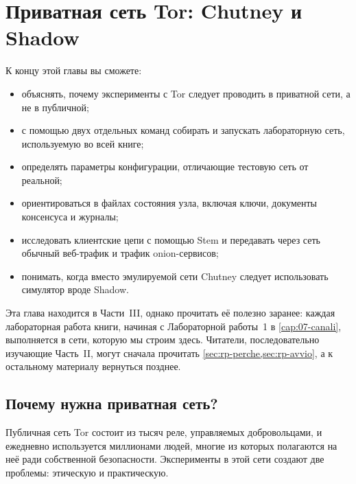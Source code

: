 \chapter{Приватная сеть Tor: Chutney и Shadow}\label{cap:19-rete-privata}

\begin{obiettivi}
К концу этой главы вы сможете:
\begin{itemize}[nosep]
  \item объяснять, почему эксперименты с Tor следует проводить в приватной сети, а не в публичной;
  \item с помощью двух отдельных команд собирать и запускать лабораторную сеть, используемую во всей книге;
  \item определять параметры конфигурации, отличающие тестовую сеть от реальной;
  \item ориентироваться в файлах состояния узла, включая ключи, документы консенсуса и журналы;
  \item исследовать клиентские цепи с помощью Stem и передавать через сеть обычный веб-трафик и трафик onion-сервисов;
  \item понимать, когда вместо эмулируемой сети Chutney следует использовать симулятор вроде Shadow.
\end{itemize}
\end{obiettivi}

Эта глава находится в Части~III, однако прочитать её полезно заранее: каждая лабораторная работа книги, начиная с Лабораторной работы~1 в \cref{cap:07-canali}, выполняется в сети, которую мы строим здесь. Читатели, последовательно изучающие Часть~II, могут сначала прочитать \cref{sec:rp-perche,sec:rp-avvio}, а к остальному материалу вернуться позднее.

\section{Почему нужна приватная сеть?}\label{sec:rp-perche}

Публичная сеть Tor состоит из тысяч реле, управляемых добровольцами, и ежедневно используется миллионами людей, многие из которых полагаются на неё ради собственной безопасности. Эксперименты в этой сети создают две проблемы: этическую и практическую.

